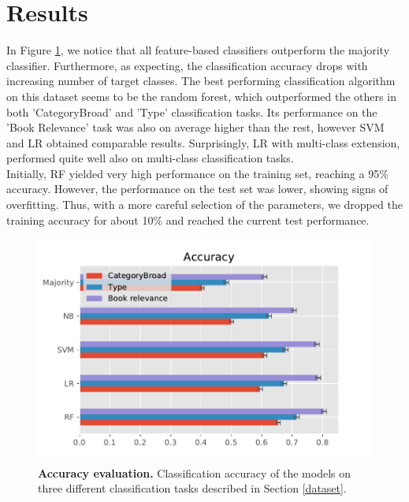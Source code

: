 \documentclass[11pt,a4paper]{article}
\begin{document}
\section{Results}
In Figure \ref{fig:acc_res}, we notice that all feature-based classifiers outperform the majority classifier. Furthermore, as expecting, the classification accuracy drops with increasing number of target classes. The best performing classification algorithm on this dataset seems to be the random forest, which outperformed the others in both 'CategoryBroad' and 'Type' classification tasks. Its performance on the 'Book Relevance' task was also on average higher than the rest, however SVM and LR obtained comparable results. Surprisingly, LR with multi-class extension, performed quite well also on multi-class classification tasks.\\
Initially, RF yielded very high performance on the training set, reaching a 95\% accuracy. However, the performance on the test set was lower, showing signs of overfitting. Thus, with a more careful selection of the parameters, we dropped the training accuracy for about 10\% and reached the current test performance.\\
\begin{figure}[h]
    \centering
    \includegraphics[width = \linewidth]{../results/Accuracy_plot.pdf}
    \caption{\textbf{Accuracy evaluation.} Classification accuracy of the models on three different classification tasks described in Section \ref{dataset}.}
    \label{fig:acc_res}
\end{figure}
\end{document}
